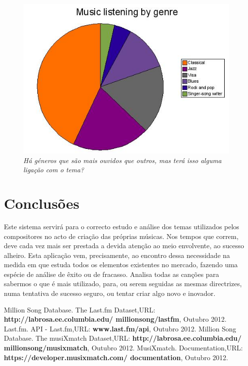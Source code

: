 \documentclass[twocolumn,twoside,10pt,a4paper]{article}
\begin{document}
\begin{figure}[ht]
\centerline{\includegraphics[scale=.36]{statistics.jpg}}
\caption{{\it Há géneros que são mais ouvidos que outros, mas terá isso alguma ligação com o tema?}}  
\label{fig:generos}
\end{figure}

\section{Conclusões}\label{sec:conclude}

Este sistema servirá para o correcto estudo e análise dos temas utilizados pelos compositores no acto de criação das próprias músicas. Nos tempos que correm, deve cada vez mais ser prestada a devida atenção ao meio envolvente, ao sucesso alheiro. Esta aplicação vem, precisamente, ao encontro dessa necessidade na medida em que estuda todos os elementos existentes no mercado, fazendo uma espécie de análise de êxito ou de fracasso. Analisa todas as canções para sabermos o que é mais utilizado, para, ou serem seguidas as mesmas directrizes, numa tentativa de sucesso seguro, ou tentar criar algo novo e inovador.

\begin{thebibliography}{4}  
 Million Song Database. The Last.fm Dataset,URL: \textbf{http://labrosa.ee.columbia.edu/
millionsong/lastfm}, Outubro 2012.
 Last.fm. API - Last.fm,URL: \textbf{www.last.fm/api}, Outubro 2012.
 Million Song Database.  The musiXmatch Dataset,URL: \textbf{http://labrosa.ee.columbia.edu/
millionsong/musixmatch}, Outubro 2012.
 MusiXmatch. Documentation,URL: \textbf{https://developer.musixmatch.com/
documentation}, Outubro 2012.
\end{thebibliography}
\end{document}
